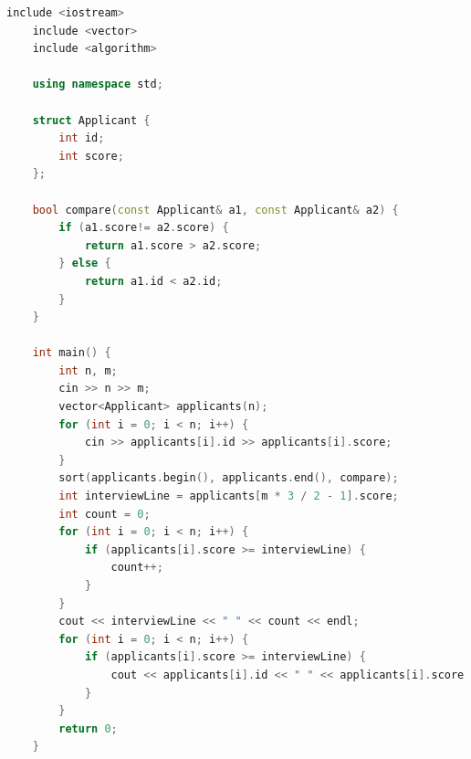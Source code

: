 \documentclass[12pt,twiside,a4paper]{ctexbook}
\numberwithin{chapter}{part}
\begin{document}
\begin{lstlisting}[language=c++,breaklines=true]
    include <iostream>
    include <vector>
    include <algorithm>
    
    using namespace std;
    
    struct Applicant {
        int id;
        int score;
    };
    
    bool compare(const Applicant& a1, const Applicant& a2) {
        if (a1.score!= a2.score) {
            return a1.score > a2.score;
        } else {
            return a1.id < a2.id;
        }
    }
    
    int main() {
        int n, m;
        cin >> n >> m;
        vector<Applicant> applicants(n);
        for (int i = 0; i < n; i++) {
            cin >> applicants[i].id >> applicants[i].score;
        }
        sort(applicants.begin(), applicants.end(), compare);
        int interviewLine = applicants[m * 3 / 2 - 1].score;
        int count = 0;
        for (int i = 0; i < n; i++) {
            if (applicants[i].score >= interviewLine) {
                count++;
            }
        }
        cout << interviewLine << " " << count << endl;
        for (int i = 0; i < n; i++) {
            if (applicants[i].score >= interviewLine) {
                cout << applicants[i].id << " " << applicants[i].score << endl;
            }
        }
        return 0;
    }
\end{lstlisting}
\end{document}
